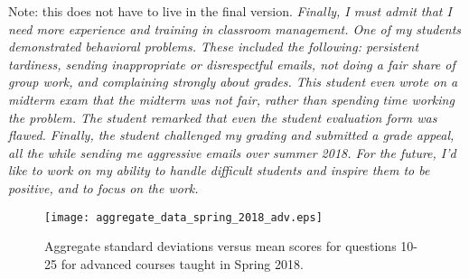 \documentclass[../../main.tex]{subfiles}
\begin{document}
Note: this does not have to live in the final version. \textit{Finally, I must admit that I need more experience and training in classroom management.  One of my students demonstrated behavioral problems.  These included the following: persistent tardiness, sending inappropriate or disrespectful emails, not doing a fair share of group work, and complaining strongly about grades.  This student even wrote \textit{on a midterm exam} that the midterm was not fair, rather than spending time working the problem.  The student remarked that even the student evaluation form was flawed.  Finally, the student challenged my grading and submitted a grade appeal, all the while sending me aggressive emails over summer 2018.  For the future, I'd like to work on my ability to handle difficult students and inspire them to be positive, and to focus on the work.}

\begin{figure}
\centering
\texttt{[image: aggregate\_data\_spring\_2018\_adv.eps]}
\caption{\label{fig:ag_data2} Aggregate standard deviations versus mean scores for questions 10-25 for advanced courses taught in Spring 2018.}
\end{figure}
\end{document}
